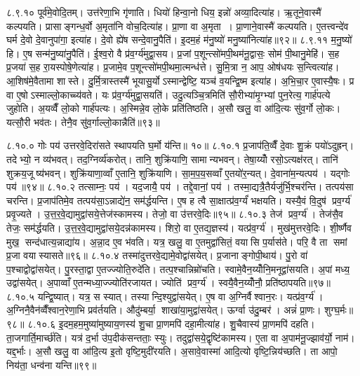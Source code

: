 ८.९.१०
पूर्व॑मे॒वोदि॒तम्। उत्त॑रेणा॒भि गृ॑णाति। धियो॑ हिन्वा॒नो धिय॒ इन्नो॑ अव्या॒दित्या॑ह। ऋ॒तूने॒वास्मै॑ कल्पयति। प्रासाङ्गन्ध॒र्वो अ॒मृता॑नि वोच॒दित्या॑ह। प्रा॒णा वा अ॒मृता। प्रा॒णाने॒वास्मै॑ कल्पयति। ए॒तत्त्वन्दे॑व घर्म दे॒वो दे॒वानुपा॑गा॒ इत्या॑ह। दे॒वो ह्ये॑ष सन्दे॒वानु॒पैति॑। इ॒दम॒हं म॑नु॒ष्यो॑ मनु॒ष्या॑नित्या॑ह॥९२॥
८.९.११
म॒नु॒ष्यो॑ हि। ए॒ष सन्म॑नु॒ष्या॑नु॒पैति॑। ई॒श्व॒रो वै प्र॑व॒र्ग्य॑मुद्वा॒सय\sn{}। प्र॒जां प॒शून्त्सो॑मपी॒थम॑नू॒द्वासः॒ सोम॑ पी॒थानु॒मेहि॑। स॒ह प्र॒जया॑ स॒ह रा॒यस्पोषे॒णेत्या॑ह। प्र॒जामे॒व प॒शून्त्सो॑मपी॒थमा॒त्मन्ध॑त्ते। सु॒मि॒त्रा न॒ आप॒ ओष॑धयः स॒न्त्वित्या॑ह। आ॒शिष॑मे॒वैतामा शास्ते। दु॒र्मि॒त्रास्तस्मै॑ भूयासु॒र्योऽस्मान्द्वेष्टि॒ यञ्च॑ व॒यन्द्वि॒ष्म इत्या॑ह। अ॒भि॒चा॒र ए॒वास्यै॒षः। प्र वा ए॒षोऽस्माल्लो॒काच्च्य॑वते। यः प्र॑व॒र्ग्य॑मुद्वा॒सयति॑। उदु॒त्यञ्चि॒त्रमिति॑ सौ॒रीभ्या॑मृ॒ग्भ्यां पुन॒रेत्य॒ गार्\mbox{}ह॑पत्ये जुहोति। अ॒यव्वैँ लो॒को गार्\mbox{}ह॑पत्यः। अ॒स्मिन्ने॒व लो॒के प्रति॑तिष्ठति। अ॒सौ खलु॒ वा आ॑दि॒त्यः सु॑व॒र्गो लो॒कः। यत्सौ॒री भव॑तः। तेनै॒व सु॑व॒र्गाल्लो॒कान्नैति॑॥९३॥
\anuvakamend

८.१०.०
गोः पय॑ उत्तरवे॒दिरा॑सते स्थापयति घ॒र्मो य॑न्ति॥ १०॥
८.१०.१
प्र॒जाप॑ति॒व्वैँ दे॒वाः  शु॒क्रं पयो॑ऽदुह्रन्। तदेभ्यो॒ न व्य॑भवत्। तद॒ग्निर्व्य॑करोत्। तानि॒ शुक्रि॑याणि॒ सामान्यभवन्। तेषा॒य्योँ रसो॒ऽत्यक्ष॑रत्। तानि॑ शुक्रय॒जूष्य॑भवन्। शुक्रि॑याणा॒व्वाँ ए॒तानि॒ शुक्रि॑याणि। सा॒म॒प॒य॒सव्वाँ ए॒तयो॑र॒न्यत्। दे॒वाना॑म॒न्यत्पय॑। यद्गोः पय॑॥९४॥
८.१०.२
तत्साम्नः॒ पय॑। यद॒जायै॒ पय॑। तद्दे॒वानां॒ पय॑। तस्मा॒द्यत्रै॒तैर्यजु॑र्भि॒श्चर॑न्ति। तत्पय॑सा चरन्ति। प्र॒जाप॑तिमे॒व तत्पय॑सा॒ऽन्नाद्ये॑न॒ सम॑र्द्धयन्ति। ए॒ष ह त्वै सा॒क्षात्प्र॑व॒र्ग्यं॑ भक्षयति। यस्यै॒वं  वि॒दुष॑ प्रव॒र्ग्य॑ प्रवृ॒ज्यते। उ॒त्त॒र॒वे॒द्यामुद्वा॑सये॒त्तेज॑स्कामस्य। तेजो॒ वा उ॑त्तरवे॒दिः॥९५॥
८.१०.३
तेज॑ प्रव॒र्ग्य॑। तेज॑सै॒व तेजः॒ सम॑र्द्धयति। उ॒त्त॒र॒वे॒द्यामुद्वा॑सये॒दन्न॑कामस्य। शिरो॒ वा ए॒तद्य॒ज्ञस्य॑। यत्प्र॑व॒र्ग्य॑। मुख॑मुत्तरवे॒दिः। शी॒र्ष्णैव मुख॒ सन्द॑धात्य॒न्नाद्या॑य। अ॒न्ना॒द ए॒व भ॑वति। यत्र॒ खलु॒ वा ए॒तमुद्वा॑सितं॒ वयासि प॒र्यास॑ते। परि॒ वै ता समां प्र॒जा वयास्यासते॥९६॥
८.१०.४
तस्मा॑दुत्तरवे॒द्यामे॒वोद्वा॑सयेत्। प्र॒जानाङ्गोपी॒थाय॑। पु॒रो वा॑ प॒श्चाद्वोद्वा॑सयेत्। पु॒रस्ता॒द्वा ए॒तज्ज्योति॒रुदे॑ति। तत्प॒श्चान्निम्रो॑चति। स्वामे॒वैन॒य्योँनि॒मनूद्वा॑सयति। अ॒पां मध्य॒ उद्वा॑सयेत्। अ॒पाव्वाँ ए॒तन्मध्या॒ज्ज्योति॑रजायत। ज्योति॑ प्रव॒र्ग्य॑। स्वयै॒वैन॒य्योँनौ॒ प्रति॑ष्ठापयति॥९७॥
८.१०.५
यन्द्वि॒ष्यात्। यत्र॒ स स्यात्। तस्यान्दि॒श्युद्वा॑सयेत्। ए॒ष वा अ॒ग्निर्वैश्वान॒रः। यत्प्र॑व॒र्ग्य॑। अ॒ग्निनै॒वैन॑व्वैँश्वान॒रेणा॒भि प्रव॑र्तयति। औदु॑म्बर्या॒ शाखा॑या॒मुद्वा॑सयेत्। ऊर्ग्वा उ॑दु॒म्बर॑। अन्नं॑ प्रा॒णः। शुग्घ॒र्मः॥९८॥
८.१०.६
इ॒दम॒हम॒मुष्या॑मुष्याय॒णस्य॑ शु॒चा प्रा॒णमपि॑ दहा॒मीत्या॑ह। शु॒चैवास्य॑ प्रा॒णमपि॑ दहति। ता॒जगार्ति॒मार्च्छ॑ति। यत्र॑ द॒र्भा उ॑प॒दीक॑सन्तताः॒ स्युः। तदुद्वा॑सये॒द्वृष्टि॑कामस्य। ए॒ता वा अ॒पाम॑नू॒ज्झाव॑र्यो॒ नाम॑। यद्द॒र्भाः। अ॒सौ खलु॒ वा आ॑दि॒त्य इ॒तो वृष्टि॒मुदी॑रयति। अ॒सावे॒वास्मा॑ आदि॒त्यो वृष्टि॒न्निय॑च्छति। ता आपो॒ निय॑ता॒ धन्व॑ना यन्ति॥९९॥
\anuvakamend

